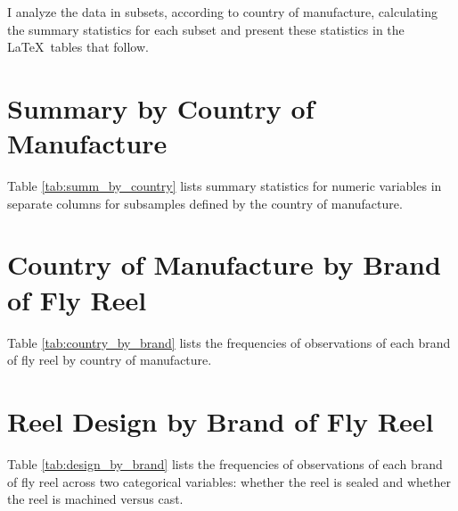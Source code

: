 I analyze the data in subsets, according to country of manufacture, 
calculating the summary statistics for each subset and present these 
statistics in the \LaTeX\ tables that follow.

\vfill


\pagebreak
\section{Summary by Country of Manufacture}

Table \ref{tab:summ_by_country} lists summary statistics for numeric variables
in separate columns for subsamples defined by the country of manufacture. 




\pagebreak
\section{Country of Manufacture by Brand of Fly Reel}

Table \ref{tab:country_by_brand} lists the frequencies of observations of 
each brand of fly reel by country of manufacture. 



\pagebreak
\section{Reel Design by Brand of Fly Reel}

Table \ref{tab:design_by_brand} lists the frequencies of observations of 
each brand of fly reel across two categorical variables:
whether the reel is sealed
and whether the reel is machined versus cast. 






% 

